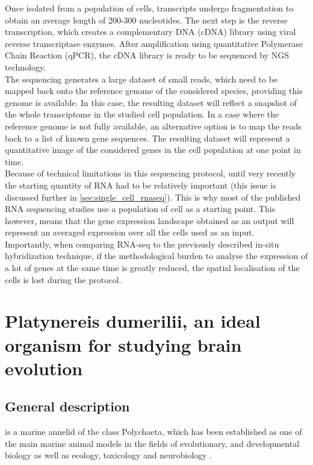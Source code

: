     Once isolated from a population of cells, transcripts undergo fragmentation to obtain an average length of 200-300 nucleotides. The next step is the reverse transcription, which creates a complementary DNA (cDNA) library using viral reverse transcriptase enzymes. After amplification using quantitative Polymerase Chain Reaction (qPCR), the cDNA library is ready to be sequenced by NGS technology.\\
    
    The sequencing generates a large dataset of small reads, which need to be mapped back onto the reference genome of the considered species, providing this genome is available. In this case, the resulting dataset will reflect a snapshot of the whole transciptome in the studied cell population. In a case where the reference genome is not fully available, an alternative option is to map the reads back to a list of known gene sequences. The resulting dataset will represent a quantitative image of the considered genes in the cell population at one point in time.\\
    
    Because of technical limitations in this sequencing protocol, until very recently the starting quantity of RNA had to be relatively important (this issue is discussed further in \ref{sec:single_cell_rnaseq}). This is why most of the published RNA sequencing studies use a population of cell as a starting point. This however, means that the gene expression landscape obtained as an output will represent an averaged expression over all the cells used as an input.\\
    
    Importantly, when comparing RNA-seq to the previously described in-situ hybridization technique, if the methodological burden to analyse the expression of a lot of genes at the same time is greatly reduced, the spatial localisation of the cells is lost during the protocol.\\
    
    
\section{Platynereis dumerilii, an ideal organism for studying brain evolution}\label{sec:platynereis}
     \subsection{General description}
     \platyfull{} is a marine annelid of the class Polychaeta, which has been established as one of the main marine animal models in the fields of evolutionary, and developmental biology as well as ecology, toxicology and neurobiology \cite{hutchinson95,tessmar03,hardege99,dorresteijn90,fischer04,Fischer10}.\\
     
